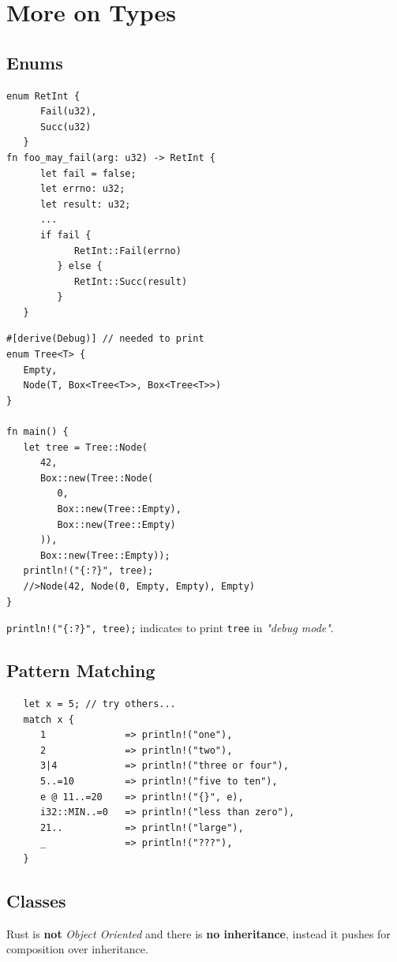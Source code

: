 \section{More on Types}
\subsection{Enums}
\begin{paracol}{2}
   \begin{lstlisting}
enum RetInt {
      Fail(u32),
      Succ(u32)
   }
fn foo_may_fail(arg: u32) -> RetInt {
      let fail = false;
      let errno: u32;
      let result: u32;
      ...
      if fail {
            RetInt::Fail(errno)
         } else {
            RetInt::Succ(result)
         }
   }
\end{lstlisting}
\switchcolumn
\begin{lstlisting}
#[derive(Debug)] // needed to print
enum Tree<T> {
   Empty,
   Node(T, Box<Tree<T>>, Box<Tree<T>>)
}

fn main() {
   let tree = Tree::Node(
      42,
      Box::new(Tree::Node(
         0,
         Box::new(Tree::Empty),
         Box::new(Tree::Empty)
      )),
      Box::new(Tree::Empty));
   println!("{:?}", tree);
   //>Node(42, Node(0, Empty, Empty), Empty)
}
\end{lstlisting}
   \lstinline|println!("{:?}", tree);| indicates to print \lstinline|tree| in \textit{"debug mode"}.
\end{paracol}

\subsection{Pattern Matching}
\begin{lstlisting}
   let x = 5; // try others...
   match x {
      1              => println!("one"),
      2              => println!("two"),
      3|4            => println!("three or four"),
      5..=10         => println!("five to ten"),
      e @ 11..=20    => println!("{}", e),
      i32::MIN..=0   => println!("less than zero"),
      21..           => println!("large"),
      _              => println!("???"),
   }
\end{lstlisting}


\subsection{Classes}
Rust is \textbf{not} \textit{Object Oriented} and there is \textbf{no inheritance}, instead it pushes for composition over inheritance.

